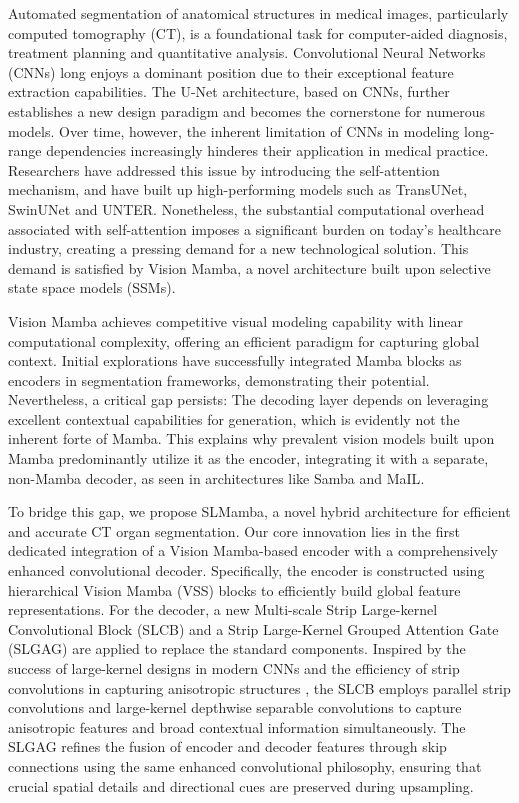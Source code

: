 \documentclass[10pt, a4paper, twocolumn]{article}
\begin{document}
Automated segmentation of anatomical structures in medical images, particularly computed tomography (CT), is a foundational task for computer-aided diagnosis, treatment planning and quantitative analysis\cite{ronneberger2015unet,milletari2016vnet,isensee2021nnu}. Convolutional Neural Networks (CNNs) long enjoys a dominant position due to their exceptional feature extraction capabilities. The U-Net architecture, based on CNNs, further establishes a new design paradigm and becomes the cornerstone for numerous models. Over time, however, the inherent limitation of CNNs in modeling long-range dependencies increasingly hinderes their application in medical practice. Researchers have addressed this issue by introducing the self-attention mechanism, and have built up high-performing models such as TransUNet\cite{chen2021transunet}, SwinUNet\cite{cao2021swinunet} and UNTER\cite{hatamizadeh2022unetr}. Nonetheless, the substantial computational overhead associated with self-attention imposes a significant burden on today's healthcare industry, creating a pressing demand for a new technological solution. This demand is satisfied by Vision Mamba, a novel architecture built upon selective state space models (SSMs)\cite{gu2023mamba,liu2024vmamba,zhu2024vim}.

Vision Mamba achieves competitive visual modeling capability with linear computational complexity, offering an efficient paradigm for capturing global context. Initial explorations have successfully integrated Mamba blocks as encoders in segmentation frameworks\cite{ruan2024vmunet,ma2024umamba}, demonstrating their potential. Nevertheless, a critical gap persists: The decoding layer depends on leveraging excellent contextual capabilities for generation, which is evidently not the inherent forte of Mamba. This explains why prevalent vision models built upon Mamba predominantly utilize it as the encoder, integrating it with a separate, non-Mamba decoder, as seen in architectures like Samba\cite{Smamba} and MaIL\cite{MaIL}.

To bridge this gap, we propose SLMamba, a novel hybrid architecture for efficient and accurate CT organ segmentation. Our core innovation lies in the first dedicated integration of a Vision Mamba-based encoder with a comprehensively enhanced convolutional decoder. Specifically, the encoder is constructed using hierarchical Vision Mamba (VSS) blocks to efficiently build global feature representations. For the decoder, a new Multi-scale Strip Large-kernel Convolutional Block (SLCB) and a Strip Large-Kernel Grouped Attention Gate (SLGAG) are applied to replace the standard components. Inspired by the success of large-kernel designs in modern CNNs \cite{liu2022convnext} and the efficiency of strip convolutions in capturing anisotropic structures \cite{hou2020strippooling}, the SLCB employs parallel strip convolutions and large-kernel depthwise separable convolutions to capture anisotropic features and broad contextual information simultaneously. The SLGAG refines the fusion of encoder and decoder features through skip connections using the same enhanced convolutional philosophy, ensuring that crucial spatial details and directional cues are preserved during upsampling.
\end{document}
